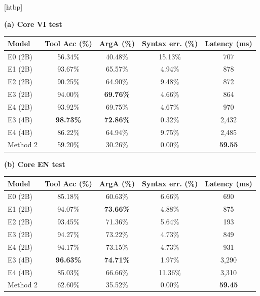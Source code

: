 \documentclass[10pt,twocolumn,a4paper]{article}
\makeatletter
\renewenvironment{table}{\@dblfloat{table}}{\end@dblfloat}
\newcommand{\tabletext}{\small}
\makeatother
\begin{document}
\begin{table}[htbp]
    \centering
    \caption{Core VI and Core EN results (7,712 instances per split).}
    \label{tab:core-results}
    \tabletext
    \textbf{(a) Core VI test}\\[2pt]
    \begin{tabular*}{\textwidth}{@{\extracolsep{\fill}}lcccc@{}}
        \toprule
        \textbf{Model} & \textbf{Tool Acc (\%)} & \textbf{ArgA (\%)} & \textbf{Syntax err. (\%)} & \textbf{Latency (ms)} \\
        \midrule
        E0 (2B) & 56.34\% & 40.48\% & 15.13\% & 707 \\
        E1 (2B) & 93.67\% & 65.57\% & 4.94\% & 878 \\
        E2 (2B) & 90.25\% & 64.90\% & 9.48\% & 872 \\
        E3 (2B) & 94.00\% & \textbf{69.76\%} & 4.66\% & 864 \\
        E4 (2B) & 93.92\% & 69.75\% & 4.67\% & 970 \\
        E3 (4B) & \textbf{98.73\%} & \textbf{72.86\%} & 0.32\% & 2,432 \\
        E4 (4B) & 86.22\% & 64.94\% & 9.75\% & 2,485 \\
        Method 2 & 59.20\% & 30.26\% & 0.00\% & \textbf{59.55} \\
        \bottomrule
    \end{tabular*}
    \par\medskip
    \textbf{(b) Core EN test}\\[2pt]
    \begin{tabular*}{\textwidth}{@{\extracolsep{\fill}}lcccc@{}}
        \toprule
        \textbf{Model} & \textbf{Tool Acc (\%)} & \textbf{ArgA (\%)} & \textbf{Syntax err. (\%)} & \textbf{Latency (ms)} \\
        \midrule
        E0 (2B) & 85.18\% & 60.63\% & 6.66\% & 690 \\
        E1 (2B) & 94.07\% & \textbf{73.66\%} & 4.88\% & 875 \\
        E2 (2B) & 93.45\% & 71.36\% & 5.64\% & 193 \\
        E3 (2B) & 94.27\% & 73.22\% & 4.73\% & 849 \\
        E4 (2B) & 94.17\% & 73.15\% & 4.73\% & 931 \\
        E3 (4B) & \textbf{96.63\%} & \textbf{74.71\%} & 1.97\% & 3,290 \\
        E4 (4B) & 85.03\% & 66.66\% & 11.36\% & 3,310 \\
        Method 2 & 62.60\% & 35.52\% & 0.00\% & \textbf{59.45} \\
        \bottomrule
    \end{tabular*}
\end{table}
\end{document}
